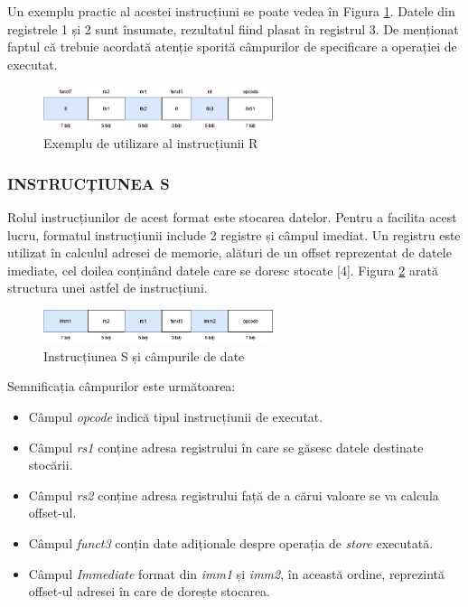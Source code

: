 \documentclass[12pt]{article}
\begin{document}
Un exemplu practic al acestei instrucțiuni se poate vedea în Figura \ref{Figura:11}. Datele din registrele 1 și 2 sunt însumate, rezultatul fiind plasat în registrul 3. De menționat faptul că trebuie acordată atenție sporită câmpurilor de specificare a operației de executat.
\newpage
 \begin{figure}[h!]
 \includegraphics[width=0.6\textwidth]{rtypeexample.png}
 \centering
 \caption{Exemplu de utilizare al instrucțiunii R}
 \label{Figura:11}
 \end{figure}

\subsubsection{INSTRUCȚIUNEA S}
Rolul instrucțiunilor de acest format este stocarea datelor. Pentru a facilita acest lucru, formatul instrucțiunii include 2 registre și câmpul imediat. Un registru este utilizat în calculul adresei de memorie, alături de un offset reprezentat de datele imediate, cel doilea conținând datele care se doresc stocate [4]. Figura \ref{Figura:12} arată structura unei astfel de instrucțiuni.
 \begin{figure}[h!]
 \includegraphics[width=0.6\textwidth]{stype.png}
 \centering
 \caption{Instrucțiunea S și câmpurile de date}
 \label{Figura:12}
 \end{figure}
 
Semnificația câmpurilor este următoarea:
 \begin{itemize}
\item Câmpul \textit{opcode} indică tipul instrucțiunii de executat.
\item Câmpul \textit{rs1} conține adresa registrului în care se găsesc datele destinate stocării.
\item Câmpul \textit{rs2} conține adresa registrului față de a cărui valoare se va calcula offset-ul.
\item Câmpul \textit{funct3} conțin date adiționale despre operația de \textit{store} executată.
\item Câmpul \textit{Immediate} format din \textit{imm1} și \textit{imm2}, în această ordine,  reprezintă offset-ul adresei în care de dorește stocarea.
\end{itemize}
\end{document}
